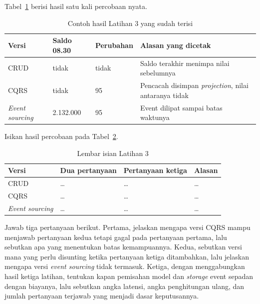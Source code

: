 Tabel~\ref{tab:lat3cqrs-contoh} berisi hasil satu kali percobaan nyata.

\begin{table}[htbp]
  \centering
  \caption{Contoh hasil Latihan 3 yang sudah terisi}
  \label{tab:lat3cqrs-contoh}
  \begin{tabularx}{\textwidth}{|l|l|l|X|}
    \hline
    \textbf{Versi} & \textbf{Saldo 08.30} & \textbf{Perubahan} & \textbf{Alasan yang dicetak} \\
    \hline
    CRUD & tidak & tidak & Saldo terakhir menimpa nilai sebelumnya \\
    \hline
    CQRS & tidak & 95 & Pencacah disimpan \textit{projection}, nilai antaranya tidak \\
    \hline
    \textit{Event sourcing} & 2.132.000 & 95 & Event dilipat sampai batas waktunya \\
    \hline
  \end{tabularx}
\end{table}

Isikan hasil percobaan pada Tabel~\ref{tab:lat3cqrs-hasil}.

\begin{table}[htbp]
  \centering
  \caption{Lembar isian Latihan 3}
  \label{tab:lat3cqrs-hasil}
  \begin{tabularx}{\textwidth}{|l|l|l|X|}
    \hline
    \textbf{Versi} & \textbf{Dua pertanyaan} & \textbf{Pertanyaan ketiga} & \textbf{Alasan} \\
    \hline
    CRUD & \dots & \dots & \dots \\
    \hline
    CQRS & \dots & \dots & \dots \\
    \hline
    \textit{Event sourcing} & \dots & \dots & \dots \\
    \hline
  \end{tabularx}
\end{table}

Jawab tiga pertanyaan berikut. Pertama, jelaskan mengapa versi CQRS mampu
menjawab pertanyaan kedua tetapi gagal pada pertanyaan pertama, lalu sebutkan
apa yang menentukan batas kemampuannya. Kedua, sebutkan versi mana yang perlu
disunting ketika pertanyaan ketiga ditambahkan, lalu jelaskan mengapa versi
\textit{event sourcing} tidak termasuk. Ketiga, dengan menggabungkan hasil
ketiga latihan, tentukan kapan pemisahan model dan \textit{storage} event
sepadan dengan biayanya, lalu sebutkan angka latensi, angka penghitungan ulang,
dan jumlah pertanyaan terjawab yang menjadi dasar keputusannya.
